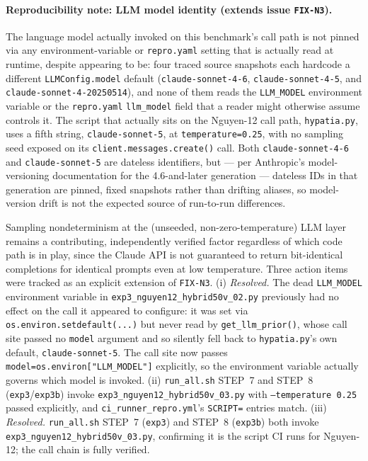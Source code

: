 \documentclass[twoside,11pt]{article}
\begin{document}
\paragraph{Reproducibility note: LLM model identity (extends issue
\texttt{FIX-N3}).} The language model actually
invoked on this benchmark's call path is not pinned via any
environment-variable or \texttt{repro.yaml} setting that is actually read
at runtime, despite appearing to be: four traced source snapshots each
hardcode a different \texttt{LLMConfig.model} default
(\texttt{claude-sonnet-4-6}, \texttt{claude-sonnet-4-5}, and
\texttt{claude-sonnet-4-20250514}), and none of them reads the
\texttt{LLM\_MODEL} environment variable or the \texttt{repro.yaml}
\texttt{llm\_model} field that a reader might otherwise assume controls
it. The script that actually sits on the Nguyen-12 call path,
\texttt{hypatia.py}, uses a fifth string, \texttt{claude-sonnet-5}, at
\texttt{temperature=0.25}, with no sampling seed exposed on its
\texttt{client.messages.create()} call. Both \texttt{claude-sonnet-4-6}
and \texttt{claude-sonnet-5} are dateless identifiers, but --- per
Anthropic's model-versioning documentation for the 4.6-and-later
generation --- dateless IDs in that generation are pinned, fixed
snapshots rather than drifting aliases, so model-version drift is not the
expected source of run-to-run differences.

Sampling nondeterminism at the
(unseeded, non-zero-temperature) LLM layer remains a contributing,
independently verified factor regardless of which code path is in play,
since the Claude API is not guaranteed to return bit-identical completions
for identical prompts even at low temperature. Three action items were tracked as an explicit extension of
\texttt{FIX-N3}. (i) \emph{Resolved.} The dead
\texttt{LLM\_MODEL} environment variable in
\texttt{exp3\_nguyen12\_hybrid50v\_02.py} previously had no effect on
the call it appeared to configure: it was set via
\texttt{os.environ.setdefault(...)} but never read by
\texttt{get\_llm\_prior()}, whose call site passed no \texttt{model}
argument and so silently fell back to \texttt{hypatia.py}'s own default,
\texttt{claude-sonnet-5}. The call site now passes
\texttt{model=os.environ["LLM\_MODEL"]} explicitly, so the environment
variable actually governs which model is invoked. (ii) \texttt{run\_all.sh} STEP~7 and STEP~8 (\texttt{exp3}/\texttt{exp3b}) invoke
\texttt{exp3\_nguyen12\_hybrid50v\_03.py} with \texttt{--temperature 0.25} passed
explicitly, and \texttt{ci\_runner\_repro.yml}'s \texttt{SCRIPT=} entries match. (iii) \emph{Resolved.}
\texttt{run\_all.sh} STEP~7 (\texttt{exp3}) and STEP~8 (\texttt{exp3b}) both invoke
\texttt{exp3\_nguyen12\_hybrid50v\_03.py}, confirming it is the script CI runs for
Nguyen-12; the call chain is fully verified.
\end{document}
